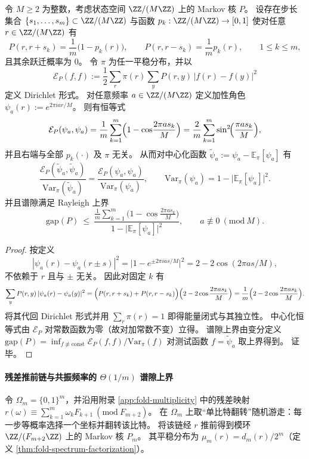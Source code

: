 \begin{proposition}\label{prop:fold-paired-step-dirichlet-character-identity}
令 \(M\ge 2\) 为整数，考虑状态空间 \(\ZZ/(M\ZZ)\) 上的 Markov 核 \(P\)。
设存在步长集合 \(\{s_1,\dots,s_m\}\subset\ZZ/(M\ZZ)\) 与函数 \(p_k:\ZZ/(M\ZZ)\to[0,1]\) 使对任意 \(r\in\ZZ/(M\ZZ)\) 有
\[
P(r,r+s_k)=\frac{1}{m}\bigl(1-p_k(r)\bigr),\qquad
P(r,r-s_k)=\frac{1}{m}p_k(r),
\qquad 1\le k\le m,
\]
且其余跃迁概率为 \(0\)。
令 \(\pi\) 为任一平稳分布，并以
\[
\mathcal E_P(f,f):=\frac12\sum_{r}\pi(r)\sum_{y}P(r,y)\,|f(r)-f(y)|^2
\]
定义 Dirichlet 形式。
对任意频率 \(a\in\ZZ/(M\ZZ)\) 定义加性角色 \(\psi_a(r):=e^{2\pi i ar/M}\)。
则有恒等式
\[
\mathcal E_P(\psi_a,\psi_a)
=\frac{1}{m}\sum_{k=1}^m\Bigl(1-\cos\!\frac{2\pi a s_k}{M}\Bigr)
=\frac{2}{m}\sum_{k=1}^m\sin^2\!\Bigl(\frac{\pi a s_k}{M}\Bigr),
\]
并且右端与全部 \(p_k(\cdot)\) 及 \(\pi\) 无关。
从而对中心化函数 \(\widetilde\psi_a:=\psi_a-\mathbb E_\pi[\psi_a]\) 有
\[
\frac{\mathcal E_P(\widetilde\psi_a,\widetilde\psi_a)}{\mathrm{Var}_\pi(\widetilde\psi_a)}
=\frac{\mathcal E_P(\psi_a,\psi_a)}{\mathrm{Var}_\pi(\psi_a)},
\qquad
\mathrm{Var}_\pi(\psi_a)=1-\bigl|\mathbb E_\pi[\psi_a]\bigr|^2.
\]
并且谱隙满足 Rayleigh 上界
\[
\mathrm{gap}(P)\ \le\
\frac{ \frac{1}{m}\sum_{k=1}^m \bigl(1-\cos\frac{2\pi a s_k}{M}\bigr)}{1-\big|\mathbb E_\pi[\psi_a]\big|^2},
\qquad a\not\equiv 0\ (\mathrm{mod}\ M).
\]
\end{proposition}

\begin{proof}
按定义
\[
|\psi_a(r)-\psi_a(r\pm s)|^2=\bigl|1-e^{\pm 2\pi i as/M}\bigr|^2=2-2\cos(2\pi as/M),
\]
不依赖于 \(r\) 且与 \(\pm\) 无关。
因此对固定 \(k\) 有
\[
\sum_{y}P(r,y)\,|\psi_a(r)-\psi_a(y)|^2
=\Bigl(P(r,r+s_k)+P(r,r-s_k)\Bigr)\Bigl(2-2\cos\frac{2\pi a s_k}{M}\Bigr)
=\frac{1}{m}\Bigl(2-2\cos\frac{2\pi a s_k}{M}\Bigr).
\]
将其代回 Dirichlet 形式并用 \(\sum_r\pi(r)=1\) 即得能量闭式与其独立性。
中心化恒等式由 \(\mathcal E_P\) 对常数函数为零（故对加常数不变）立得。
谱隙上界由变分定义
\(
\mathrm{gap}(P)=\inf_{f\not\equiv\mathrm{const}}\mathcal E_P(f,f)/\mathrm{Var}_\pi(f)
\)
对测试函数 \(f=\widetilde\psi_a\) 取上界得到。
证毕。
\end{proof}

\paragraph{残差推前链与共振频率的 \texorpdfstring{$\Theta(1/m)$}{Theta(1/m)} 谱隙上界}
令 \(\Omega_m=\{0,1\}^m\)，并沿用附录 \ref{app:fold-multiplicity} 中的残差映射
\(
r(\omega)\equiv \sum_{k=1}^m \omega_kF_{k+1}\ (\mathrm{mod}\ F_{m+2})
\)。
在 \(\Omega_m\) 上取“单比特翻转”随机游走：每一步等概率选择一个坐标并翻转该比特。
将该链经 \(r\) 推前得到模环 \(\ZZ/(F_{m+2}\ZZ)\) 上的 Markov 核 \(P_m\)。
其平稳分布为 \(\mu_m(r)=d_m(r)/2^m\)（定义 \ref{thm:fold-spectrum-factorization}）。


